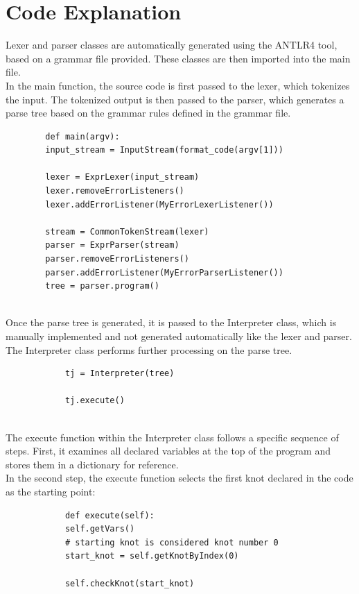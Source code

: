 \section{Code Explanation}
Lexer and parser classes are automatically generated using the ANTLR4 tool, based on a grammar file provided. These classes are then imported into the main file.
\\In the main function, the source code is first passed to the lexer, which tokenizes the input. The tokenized output is then passed to the parser, which generates a parse tree based on the grammar rules defined in the grammar file.
\begin{verbatim}
        def main(argv):
        input_stream = InputStream(format_code(argv[1]))
    
        lexer = ExprLexer(input_stream)
        lexer.removeErrorListeners()
        lexer.addErrorListener(MyErrorLexerListener())
    
        stream = CommonTokenStream(lexer)
        parser = ExprParser(stream)
        parser.removeErrorListeners()
        parser.addErrorListener(MyErrorParserListener())
        tree = parser.program()
        
\end{verbatim}


\noindent Once the parse tree is generated, it is passed to the Interpreter class, which is manually implemented and not generated automatically like the lexer and parser. The Interpreter class performs further processing on the parse tree.
\begin{verbatim}
            tj = Interpreter(tree)
        
            tj.execute()
            
\end{verbatim}


\noindent The execute function within the Interpreter class follows a specific sequence of steps. First, it examines all declared variables at the top of the program and stores them in a dictionary for reference.
\\In the second step, the execute function selects the first knot declared in the code as the starting point:
\begin{verbatim}
            def execute(self):
            self.getVars()
            # starting knot is considered knot number 0
            start_knot = self.getKnotByIndex(0)
    
            self.checkKnot(start_knot)
            
\end{verbatim}

